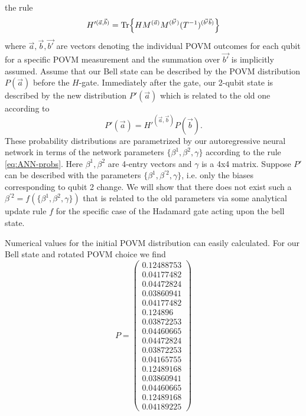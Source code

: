 \documentclass[a4]{article}
\begin{document}
the rule
\begin{equation*}
    H'^{(\vec{a},\vec{b})} = \Tr{H M^{(\Vec{a})} M ^{(\vec{b'})}
    (T^{-1})^{(\vec{b'}\vec{b})}}
\end{equation*}
where $\vec{a},\vec{b}, \vec{b'}$ are vectors denoting the individual POVM
outcomes for each qubit for a specific POVM measurement and the summation over
 $\vec{b'}$ is implicitly assumed. Assume that our Bell state can be described
 by the POVM distribution $P(\vec{a})$ before the $H$-gate. Immediately after the
 gate, our 2-qubit state is described by the new distribution $P'(\vec{a})$
 which is related to the old one according to
\begin{equation}
    P'(\vec{a}) =  H'^{(\vec{a},\vec{b})} P(\vec{b}).
\end{equation}
These probability distributions are parametrized by our autoregressive neural
 network in terms of the network parameters $\{ \beta^1, \beta^2, \gamma \}$
  according to the rule \ref{eq:ANN-probs}. Here $\beta^1, \beta^2$ are 4-entry
  vectors and $\gamma$ is a 4x4 matrix. Suppose $P'$ can be described with the
 parameters $\{ \beta^1, \beta^{'2}, \gamma \}$, i.e. only the biases
corresponding to qubit 2 change. We will show that there does not exist such a $\beta^{'2} = f(\{ \beta^1, \beta^2, \gamma \})$ that is related to the old parameters via some analytical update rule $f$ for the specific case of the
Hadamard gate acting upon the bell state. \par
Numerical values for the initial POVM distribution can easily calculated. For
our Bell state and rotated POVM choice we find
\begin{equation*}
    P = \begin{pmatrix}0.12488753 \\ 0.04177482 \\ 0.04472824 \\ 0.03860941 \\
     0.04177482 \\ 0.124896 \\ 0.03872253 \\ 0.04460665 \\ 0.04472824 \\
     0.03872253 \\ 0.04165755 \\ 0.12489168 \\ 0.03860941 \\ 0.04460665 \\
     0.12489168 \\ 0.04189225 \end{pmatrix}
\end{equation*}
\end{document}
